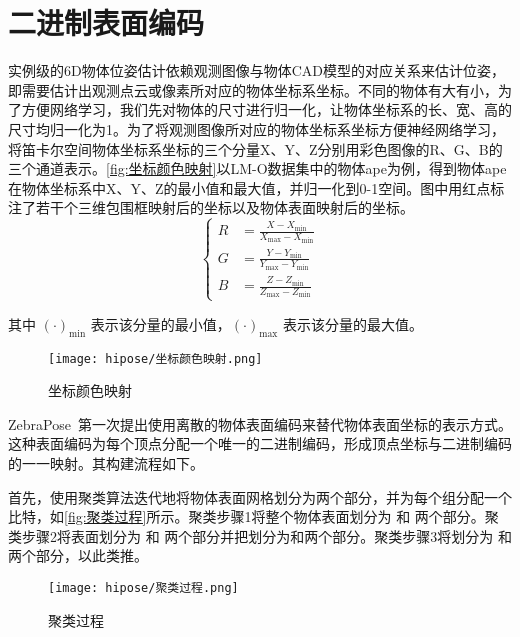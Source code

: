 \section{二进制表面编码}
\label{sec:hipose_encoding}
实例级的6D物体位姿估计依赖观测图像与物体CAD模型的对应关系来估计位姿，即需要估计出观测点云或像素所对应的物体坐标系坐标。不同的物体有大有小，为了方便网络学习，我们先对物体的尺寸进行归一化，让物体坐标系的长、宽、高的尺寸均归一化为1。为了将观测图像所对应的物体坐标系坐标方便神经网络学习，将笛卡尔空间物体坐标系坐标的三个分量X、Y、Z分别用彩色图像的R、G、B的三个通道表示。\autoref{fig:坐标颜色映射}以LM-O数据集中的物体ape为例，得到物体ape在物体坐标系中X、Y、Z的最小值和最大值，并归一化到0-1空间。图中用红点标注了若干个三维包围框映射后的坐标以及物体表面映射后的坐标。
\begin{equation}
    \left\{
    \begin{aligned}
        R &= \frac{X - X_{\min}}{X_{\max} - X_{\min}} \\
        G &= \frac{Y - Y_{\min}}{Y_{\max} - Y_{\min}} \\
        B &= \frac{Z - Z_{\min}}{Z_{\max} - Z_{\min}}
    \end{aligned}
    \right.
\end{equation}

其中 $(\cdot)_{\min}$ 表示该分量的最小值，$(\cdot)_{\max}$ 表示该分量的最大值。
\begin{figure}[ht]
    \centering
    \texttt{[image: hipose/坐标颜色映射.png]}
    \caption{坐标颜色映射}
    \label{fig:坐标颜色映射}
\end{figure}

ZebraPose~\cite{su2022zebrapose}第一次提出使用离散的物体表面编码来替代物体表面坐标的表示方式。这种表面编码为每个顶点分配一个唯一的二进制编码，形成顶点坐标与二进制编码的一一映射。其构建流程如下。

首先，使用聚类算法迭代地将物体表面网格划分为两个部分，并为每个组分配一个比特，如\autoref{fig:聚类过程}所示。聚类步骤1将整个物体表面划分为  和 两个部分。聚类步骤2将表面划分为 和 两个部分并把划分为和两个部分。聚类步骤3将划分为  和 两个部分，以此类推。

\begin{figure}[ht]
    \centering
    \texttt{[image: hipose/聚类过程.png]}
    \caption{聚类过程}
    \label{fig:聚类过程}
\end{figure}

